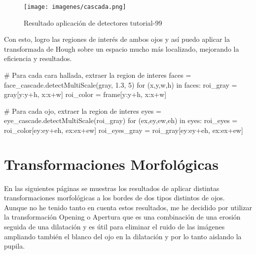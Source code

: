 \documentclass[es,gi]{ifirak}\usepackage[]{graphicx}\usepackage[]{color}
\begin{document}
\begin{figure}[hbtp]
\centering
\texttt{[image: imagenes/cascada.png]}
\caption{Resultado aplicación de detectores tutorial-99}
\end{figure}

Con esto, logro las regiones de interés de ambos ojos y así puedo aplicar la transformada de Hough sobre un espacio mucho más localizado, mejorando la eficiencia y resultados.\\

\begin{python}
# Para cada cara hallada, extraer la region de interes
    faces = face_cascade.detectMultiScale(gray, 1.3, 5)
    for (x,y,w,h) in faces:
        roi_gray = gray[y:y+h, x:x+w]
        roi_color = frame[y:y+h, x:x+w]
       
        # Para cada ojo, extraer la region de interes
        eyes = eye_cascade.detectMultiScale(roi_gray)
        for (ex,ey,ew,eh) in eyes:
            roi_eyes = roi_color[ey:ey+eh, ex:ex+ew]
            roi_eyes_gray = roi_gray[ey:ey+eh, ex:ex+ew]
\end{python}

\section{Transformaciones Morfológicas}
\paragraph{}
En las siguientes páginas se muestras los resultados de aplicar distintas transformaciones morfológicas a los bordes de dos tipos distintos de ojos.\\
 
Aunque no he tenido tanto en cuenta estos resultados, me he decidido por utilizar la transformación Opening o Apertura que es una combinación de una erosión seguida de una dilatación y es útil para eliminar el ruido de las imágenes ampliando también el blanco del ojo en la dilatación y por lo tanto aislando la pupila.\\
\end{document}
